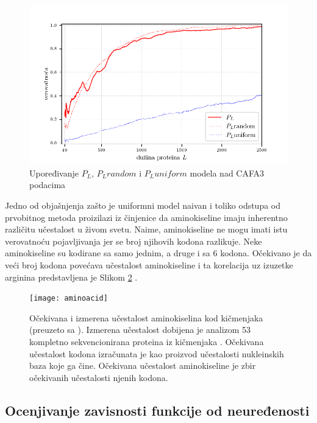 \begin{figure}[th]
\centering
\includegraphics[]{plots/PL_F_cmp}
\caption{Upoređivanje $P_L$, $P_L random$ i $P_L uniform$ modela nad CAFA3 podacima}
\label{fig:PL2}
\end{figure}


Jedno od objašnjenja zašto je uniformni model naivan i toliko odstupa od
prvobitnog metoda proizilazi iz činjenice da aminokiseline imaju inherentno
različitu učestalost u živom svetu. Naime, aminokiseline ne mogu  imati istu
verovatnoću pojavljivanja jer se  broj njihovih kodona razlikuje. Neke
aminokiseline su kodirane sa samo jednim, a druge i sa 6 kodona. Očekivano je
da veći broj kodona povećava učestalost aminokiseline i ta korelacija uz
izuzetke arginina predstavljena je Slikom \ref{fig:aminoacid}
\parencite{AKfrekvencija}.

\begin{figure}[th]
\centering
\texttt{[image: aminoacid]}
\caption{Očekivana i izmerena učestalost aminokiselina kod kičmenjaka (preuzeto sa \cite{AA_freq_link}).  \footnotesize
  Izmerena učestalost dobijena je analizom 53 kompletno sekvencionirana proteina iz kičmenjaka \cite{King1969}.
  Očekivana učestalost kodona izračunata je kao proizvod učestalosti nukleinskih baza koje ga čine.
  Očekivana učestalost aminokiseline je zbir očekivanih učestalosti njenih kodona.
}
\label{fig:aminoacid}
\end{figure}




\clearpage
\label{ocenjivanje}
\subsection{Ocenjivanje zavisnosti funkcije od neuređenosti}

